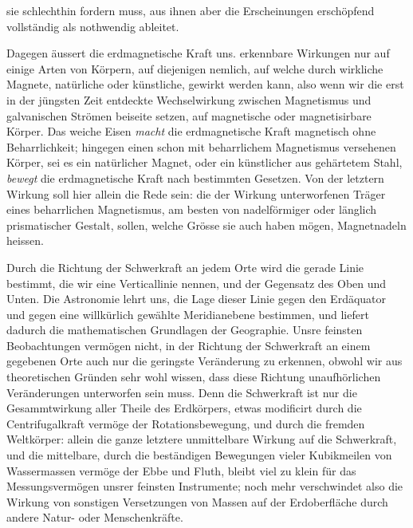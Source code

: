 \noindent sie schlechthin fordern muss, aus ihnen aber die Erscheinungen erschöpfend vollständig als nothwendig ableitet.

Dagegen äussert die erdmagnetische Kraft uns. erkennbare Wirkungen nur auf einige Arten von Körpern, auf diejenigen nemlich, auf welche durch wirkliche Magnete, natürliche oder künstliche, gewirkt werden kann, also wenn wir die erst in der jüngsten Zeit entdeckte Wechselwirkung zwischen Magnetismus und galvanischen Strömen beiseite setzen, auf magnetische oder magnetisirbare Körper. Das weiche Eisen \textit{macht} die erdmagnetische Kraft magnetisch ohne Beharrlichkeit; hingegen einen schon mit beharrlichem Magnetismus versehenen Körper, sei es ein natürlicher Magnet, oder ein künstlicher aus gehärtetem Stahl, \textit{bewegt} die erdmagnetische Kraft nach bestimmten Gesetzen. Von der letztern Wirkung soll hier allein die Rede sein: die der Wirkung unterworfenen Träger eines beharrlichen Magnetismus, am besten von nadelförmiger oder länglich prismatischer Gestalt, sollen, welche Grösse sie auch haben mögen, Magnetnadeln heissen.

Durch die Richtung der Schwerkraft an jedem Orte wird die gerade Linie bestimmt, die wir eine Verticallinie nennen, und der Gegensatz des Oben und Unten. Die Astronomie lehrt uns, die Lage dieser Linie gegen den Erdäquator und gegen eine willkürlich gewählte Meridianebene bestimmen, und liefert dadurch die mathematischen Grundlagen der Geographie. Unsre feinsten Beobachtungen vermögen nicht, in der Richtung der Schwerkraft an einem gegebenen Orte auch nur die geringste Veränderung zu erkennen, obwohl wir aus theoretischen Gründen sehr wohl wissen, dass diese Richtung unaufhörlichen Veränderungen unterworfen sein muss. Denn die Schwerkraft ist nur die Gesammtwirkung aller Theile des Erdkörpers, etwas modificirt durch die Centrifugalkraft vermöge der Rotationsbewegung, und durch die fremden Weltkörper: allein die ganze letztere unmittelbare Wirkung auf die Schwerkraft, und die mittelbare, durch die beständigen Bewegungen vieler Kubikmeilen von Wassermassen vermöge der Ebbe und Fluth, bleibt viel zu klein für das Messungsvermögen unsrer feinsten Instrumente; noch mehr verschwindet also die Wirkung von sonstigen Versetzungen von Massen auf der Erdoberfläche durch andere Natur- oder Menschenkräfte.

